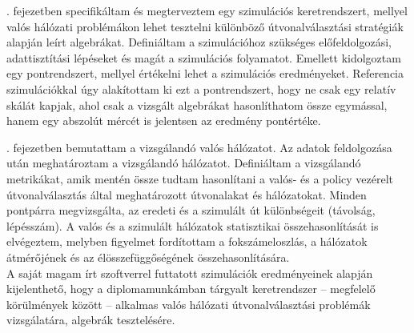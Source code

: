 . fejezetben specifikáltam és megterveztem egy szimulációs keretrendszert, mellyel valós hálózati problémákon lehet tesztelni különböző útvonalválasztási stratégiák alapján leírt algebrákat. Definiáltam a szimulációhoz szükséges előfeldolgozási, adattisztítási lépéseket és magát a szimulációs folyamatot. Emellett kidolgoztam egy pontrendszert, mellyel értékelni lehet a szimulációs eredményeket. Referencia szimulációkkal úgy alakítottam ki ezt a pontrendszert, hogy ne csak egy relatív skálát kapjak, ahol csak a vizsgált algebrákat hasonlíthatom össze egymással, hanem egy abszolút mércét is jelentsen az eredmény pontértéke.

. fejezetben bemutattam a vizsgálandó valós hálózatot. Az adatok feldolgozása után meghatároztam a vizsgálandó hálózatot. Definiáltam a vizsgálandó metrikákat, amik mentén össze tudtam hasonlítani a valós- és a policy vezérelt útvonalválasztás által meghatározott útvonalakat és hálózatokat. Minden pontpárra megvizsgálta, az eredeti és a szimulált út különbségeit (távolság, lépésszám). A valós és a szimulált hálózatok statisztikai összehasonlítását is elvégeztem, melyben figyelmet fordítottam a fokszámeloszlás, a hálózatok átmérőjének és az élösszefüggőségének összehasonlítására.\\

A saját magam írt szoftverrel futtatott szimulációk eredményeinek alapján kijelenthető, hogy a diplomamunkámban tárgyalt keretrendszer -- megfelelő körülmények között -- alkalmas valós hálózati útvonalválasztási problémák vizsgálatára, algebrák tesztelésére.
